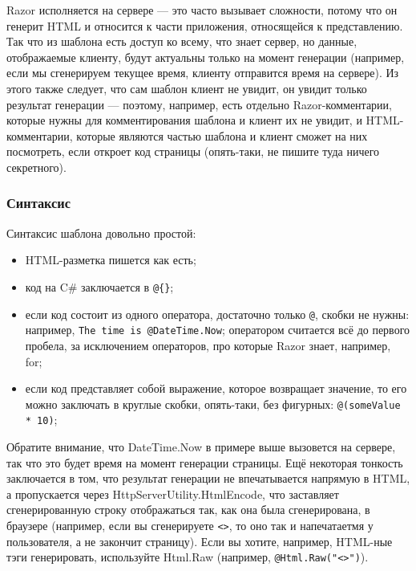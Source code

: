 \documentclass{../../text-style}
\begin{document}
Razor исполняется на сервере --- это часто вызывает сложности, потому что он генерит HTML и относится к части приложения, относящейся к представлению. Так что из шаблона есть доступ ко всему, что знает сервер, но данные, отображаемые клиенту, будут актуальны только на момент генерации (например, если мы сгенерируем текущее время, клиенту отправится время на сервере). Из этого также следует, что сам шаблон клиент не увидит, он увидит только результат генерации --- поэтому, например, есть отдельно Razor-комментарии, которые нужны для комментирования шаблона и клиент их не увидит, и HTML-комментарии, которые являются частью шаблона и клиент сможет на них посмотреть, если откроет код страницы (опять-таки, не пишите туда ничего секретного).

\subsubsection{Синтаксис}

Синтаксис шаблона довольно простой:

\begin{itemize}
    \item HTML-разметка пишется как есть;
    \item код на C\# заключается в \verb|@{}|;
    \item если код состоит из одного оператора, достаточно только \verb|@|, скобки не нужны: например, \texttt{The time is @DateTime.Now}; оператором считается всё до первого пробела, за исключением операторов, про которые Razor знает, например, for;
    \item если код представляет собой выражение, которое возвращает значение, то его можно заключать в круглые скобки, опять-таки, без фигурных: \texttt{@(someValue * 10)};
\end{itemize}

Обратите внимание, что DateTime.Now в примере выше вызовется на сервере, так что это будет время на момент генерации страницы. Ещё некоторая тонкость заключается в том, что результат генерации не впечатывается напрямую в HTML, а пропускается через HttpServerUtility.HtmlEncode, что заставляет сгенерированную строку отображаться так, как она была сгенерирована, в браузере (например, если вы сгенерируете \texttt{<\body>}, то оно так и напечатаетмя у пользователя, а не закончит страницу). Если вы хотите, например, HTML-ные тэги генерировать, используйте Html.Raw (например, \texttt{@Html.Raw("<\body>")}).
\end{document}
